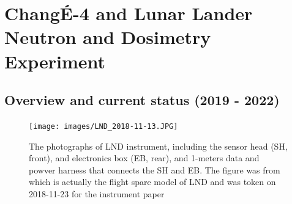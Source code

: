 \section{Chang\'E-4 and Lunar Lander Neutron and Dosimetry Experiment}
\label{sec:change_4_LND}

\subsection{Overview and current status (2019 - 2022)}

\begin{figure}
    \centering
    \texttt{[image: images/LND\_2018-11-13.JPG]}
    \caption[Photograph of Lunar Lander neutron dosimetry experiment]{The photographs of LND instrument, including the sensor head (SH, front), and electronics box (EB, rear), and 1-meters data and powver harness that connects the SH and EB. The figure was from \cite{Wimmer-2020-LND} which is actually the flight spare model of LND and was token on 2018-11-23 for the instrument paper}
    \label{Fig:LND_instrument}
\end{figure}

